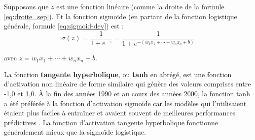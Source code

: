 	
	
	

	
	Supposons que $z$ est une fonction linéaire (comme la droite de la formule \ref{eq:droite_sep}). Et la fonction sigmoïde (en partant de la fonction logistique générale, formule \ref{eq:sigmoid-dev}) est :
	\begin{equation}\label{eq:sigmoid-activation}
	{\displaystyle \sigma (z)= {\frac {1}{1+e^{-z}}} ={\frac {1}{1+e^{-(w _{1}x_{1}+\cdots +w_{n}x_{n}+b)}}}}
	\end{equation} 
	
	avec $z = w _{1}x_{1}+\cdots +w_{n}x_{n}+b$.
	
	
	La fonction \textbf{tangente hyperbolique}, ou \textbf{tanh} en abrégé, est une fonction d'activation non linéaire de forme similaire qui génère des valeurs comprises entre -1,0 et 1,0. À la fin des années 1990 et au cours des années 2000, la fonction tanh a été préférée à la fonction d'activation sigmoïde car les modèles qui l'utilisaient étaient plus faciles à entraîner et avaient souvent de meilleures performances prédictives \cite{goodfellow2016deep}.
	La fonction d'activation tangente hyperbolique fonctionne généralement mieux que la sigmoïde logistique.
	
	
	
